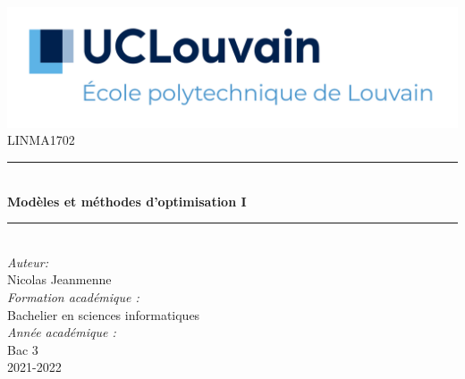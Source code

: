 \begin{titlepage}

\newcommand{\HRule}{\rule{\linewidth}{0.5mm}} 							%
\center 
 
\includegraphics[width=\textwidth]{pictures/UCLouvain-EPL.png}\\[1cm]

\textsc{\large LINMA1702}\\[1cm] 										%
\HRule \\[0.8cm]
{ \huge \bfseries Modèles et méthodes d'optimisation I}\\[0.7cm]								%
\HRule \\[2cm]
\large
\emph{Auteur:}\\
Nicolas Jeanmenne\\[1.5cm]													%
\emph{Formation académique :}\\
Bachelier en sciences informatiques\\[0.4cm]
\emph{Année académique :}\\
Bac 3\\[5cm]
{\large 2021-2022}\\[5cm] 	%

\vfill 
\end{titlepage}